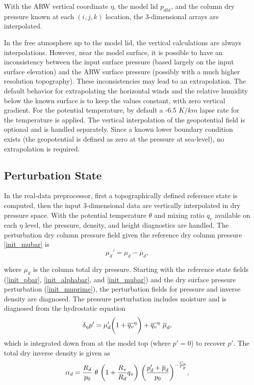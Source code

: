 \noindent
With the ARW vertical coordinate $\eta$, the model lid $p_{dht}$, and the column dry
pressure known at each $(i,j,k)$ location, the 3-dimensional arrays are interpolated.

In the free atmosphere up to the model lid, the vertical calculations are always interpolations.
However, near the model surface, it is possible to have an inconsistency between the input
surface pressure (based largely on the input surface elevation) and the ARW surface
pressure (possibly with a much higher resolution topography).  These inconsistencies
may lead to an extrapolation.  The default behavior for extrapolating the horizontal winds and
the relative humidity below the known surface is to keep the values constant, with zero vertical gradient.
For the potential temperature, by default a -6.5 $K/km$ lapse rate for the temperature is applied.
The vertical interpolation of the geopotential field is optional and is
handled separately.  Since a known lower boundary condition exists  
(the geopotential is defined as zero at the pressure at sea-level), no extrapolation is required.



\subsection{Perturbation State}
In the real-data preprocessor, first a topographically defined reference state is computed, 
then the input 3-dimensional data are vertically
interpolated in dry pressure space. With the potential temperature $\theta$ and mixing ratio
$q_v$ available on each $\eta$ level, the pressure, density, and height diagnostics are
handled.
\noindent  The perturbation dry column pressure
field given the reference dry column pressure \eqref{init_mubar} is
\begin{equation}
\mu_d'  = \mu_d - \overline{\mu}_d,
\label{init_muprime}
\end{equation}

\noindent where $\mu_d$ is the column total dry pressure.  
Starting with the reference state fields 
(\ref{init_pbar}, \ref{init_alphabar}, and \eqref{init_mubar}) and the
dry surface pressure perturbation (\ref{init_muprime}),
the perturbation fields for pressure and inverse density are diagnosed.
The pressure perturbation includes moisture and is diagnosed from 
the hydrostatic equation
%
\begin{equation}
\delta_{\eta} p' = \mu'_d \bigg(1 + {\overline{q_v}^\eta} \bigg) + 
                     \overline{q_v}^\eta~\overline \mu_d,
\notag
\end{equation}
%
\noindent 
which is
integrated down from 
at the model top (where $p'= 0$) to recover $p'$.
The total dry inverse density is given as
\begin{equation}
\alpha_d = {R_d \over p_{0} } ~ \theta~ \bigg( 1 + {R_v \over R_d}q_v \bigg)~ 
                                        \bigg( {{p'_d + \overline {p}_d} \over p_{0} } \bigg )^{-{C_v \over C_p}},
\notag
\end{equation}

